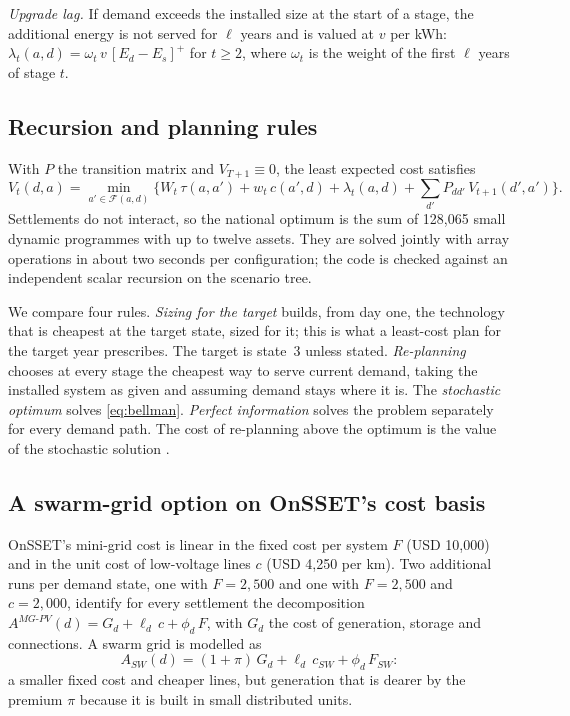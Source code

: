 \documentclass[11pt,a4paper]{article}
\begin{document}
\emph{Upgrade lag.} If demand exceeds the installed size at the start of a stage, the additional energy is not
served for $\ell$ years and is valued at $v$ per kWh: $\lambda_t(a,d)=\omega_t\,v\,[E_d-E_s]^+$ for $t\ge 2$, where
$\omega_t$ is the weight of the first $\ell$ years of stage $t$.

\subsection{Recursion and planning rules}
With $P$ the transition matrix and $V_{T+1}\equiv 0$, the least expected cost satisfies
\begin{equation}
V_t(d,a)=\min_{a'\in\mathcal F(a,d)}\Big\{W_t\,\tau(a,a')+w_t\,c(a',d)+\lambda_t(a,d)+\sum_{d'}P_{dd'}\,V_{t+1}(d',a')\Big\}.
\label{eq:bellman}
\end{equation}
Settlements do not interact, so the national optimum is the sum of 128,065 small dynamic programmes with up to
twelve assets. They are solved jointly with array operations in about two seconds per configuration; the code is
checked against an independent scalar recursion on the scenario tree.

We compare four rules. \emph{Sizing for the target} builds, from day one, the technology that is cheapest at the
target state, sized for it; this is what a least-cost plan for the target year prescribes. The target is state~3
unless stated. \emph{Re-planning} chooses at every stage the cheapest way to serve current demand, taking the
installed system as given and assuming demand stays where it is. The \emph{stochastic optimum} solves
\eqref{eq:bellman}. \emph{Perfect information} solves the problem separately for every demand path. The cost of
re-planning above the optimum is the value of the stochastic solution \citep{birge1982}.

\subsection{A swarm-grid option on OnSSET's cost basis}
OnSSET's mini-grid cost is linear in the fixed cost per system $F$ (USD 10,000) and in the unit cost of low-voltage
lines $c$ (USD 4,250 per km). Two additional runs per demand state, one with $F=2{,}500$ and one with $F=2{,}500$
and $c=2{,}000$, identify for every settlement the decomposition
$A^{MG\text{-}PV}(d)=G_d+\ell_d\,c+\phi_d\,F$, with $G_d$ the cost of generation, storage and connections. A swarm
grid is modelled as
\begin{equation}
A_{SW}(d)=(1+\pi)\,G_d+\ell_d\,c_{SW}+\phi_d\,F_{SW}:
\end{equation}
a smaller fixed cost and cheaper lines, but generation that is dearer by the premium $\pi$ because it is built in
small distributed units.
\end{document}
